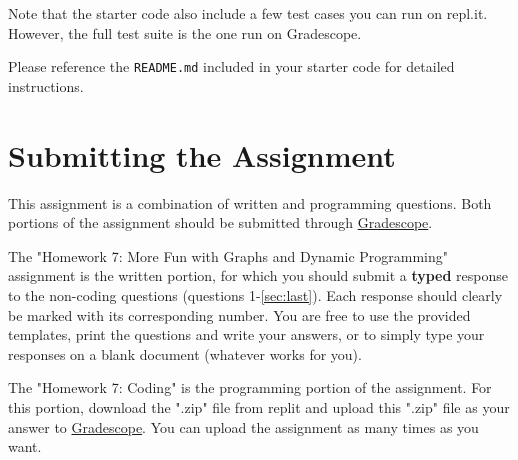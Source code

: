 \documentclass [12pt]{article}
\begin{document}
Note that the starter code also include a few test cases you can run on repl.it. However, the full test suite is the one run on Gradescope.

Please reference the \texttt{README.md} included in your starter code for detailed instructions.

\section*{Submitting the Assignment}

This assignment is a combination of written and programming questions. Both portions of the assignment should be submitted through \href{https://www.gradescope.com/courses/350304}{Gradescope}.

The "Homework 7: More Fun with Graphs and Dynamic Programming" assignment is the written portion, for which you should submit a \textbf{typed} response to the non-coding questions (questions 1-\ref{sec:last}). Each response should clearly be marked with its corresponding number. You are free to use the provided templates, print the questions and write your answers, or to simply type your responses on a blank document (whatever works for you).

The "Homework 7: Coding" is the programming portion of the assignment. For this portion, download the ".zip" file from replit and upload this ".zip" file as your answer to \href{https://www.gradescope.com/courses/350304}{Gradescope}. You can upload the assignment as many times as you want.
\end{document}
